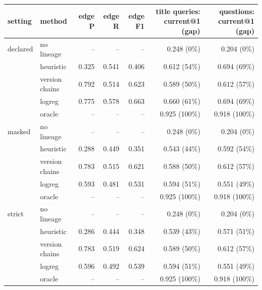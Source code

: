 \begin{tabular}{llrrrrr}
\toprule
setting & method & edge P & edge R & edge F1 & title queries: current@1 (gap) & questions: current@1 (gap) \\
\midrule
declared & no lineage & -- & -- & -- & 0.248 (0\%) & 0.204 (0\%) \\
 & heuristic & 0.325 & 0.541 & 0.406 & 0.612 (54\%) & 0.694 (69\%) \\
 & version chains & 0.792 & 0.514 & 0.623 & 0.589 (50\%) & 0.612 (57\%) \\
 & logreg & 0.775 & 0.578 & 0.663 & 0.660 (61\%) & 0.694 (69\%) \\
 & oracle & -- & -- & -- & 0.925 (100\%) & 0.918 (100\%) \\
\midrule
masked & no lineage & -- & -- & -- & 0.248 (0\%) & 0.204 (0\%) \\
 & heuristic & 0.288 & 0.449 & 0.351 & 0.543 (44\%) & 0.592 (54\%) \\
 & version chains & 0.783 & 0.515 & 0.621 & 0.588 (50\%) & 0.612 (57\%) \\
 & logreg & 0.593 & 0.481 & 0.531 & 0.594 (51\%) & 0.551 (49\%) \\
 & oracle & -- & -- & -- & 0.925 (100\%) & 0.918 (100\%) \\
\midrule
strict & no lineage & -- & -- & -- & 0.248 (0\%) & 0.204 (0\%) \\
 & heuristic & 0.286 & 0.444 & 0.348 & 0.539 (43\%) & 0.571 (51\%) \\
 & version chains & 0.783 & 0.519 & 0.624 & 0.589 (50\%) & 0.612 (57\%) \\
 & logreg & 0.596 & 0.492 & 0.539 & 0.594 (51\%) & 0.551 (49\%) \\
 & oracle & -- & -- & -- & 0.925 (100\%) & 0.918 (100\%) \\
\bottomrule
\end{tabular}
